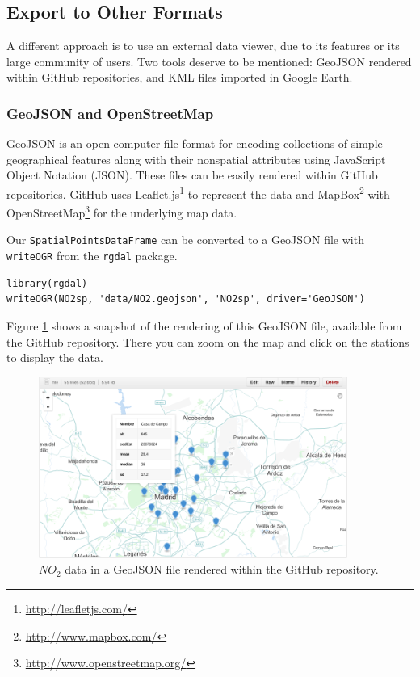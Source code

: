 \subsection{Export to Other Formats}
\label{sec-1-6}

A different approach is to use an external data viewer, due to its
features or its large community of users. Two tools deserve to be
mentioned: GeoJSON rendered within GitHub repositories, and KML files
imported in Google Earth\texttrademark.

\subsubsection{GeoJSON and OpenStreetMap}
\label{sec-1-6-1}
GeoJSON is an open computer file format for encoding collections of
simple geographical features along with their nonspatial attributes
using JavaScript Object Notation (JSON). These files can be easily
rendered within GitHub repositories. GitHub uses Leaflet.js\footnote{\url{http://leafletjs.com/}} to
represent the data and MapBox\footnote{\url{http://www.mapbox.com/}} with OpenStreetMap\footnote{\url{http://www.openstreetmap.org/}} for the
underlying map data.

Our \texttt{SpatialPointsDataFrame} can be converted to a GeoJSON file with
\texttt{writeOGR} from the \texttt{rgdal} package. 


\lstset{language=R,numbers=none}
\begin{lstlisting}
library(rgdal)
writeOGR(NO2sp, 'data/NO2.geojson', 'NO2sp', driver='GeoJSON')
\end{lstlisting}

Figure \ref{fig:geojson} shows a snapshot of the rendering of this
GeoJSON file, available from the GitHub repository. There you can zoom
on the map and click on the stations to display the data.

\begin{figure}
\includegraphics[width=0.9\textwidth]{figs/geojson.png}
\caption{\label{fig:geojson}$NO_2$ data in a GeoJSON file rendered within the GitHub repository.}
\end{figure}
